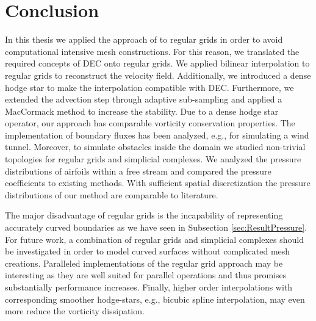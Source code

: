 \chapter{Conclusion}
\label{ch:Conclusion}

In this thesis we applied the approach of  to regular grids in order to avoid computational intensive mesh constructions.
For this reason, we translated the required concepts of DEC onto regular grids.
We applied bilinear interpolation to regular grids to reconstruct the velocity field.
Additionally, we introduced a dense hodge star to make the interpolation compatible with DEC.
Furthermore, we extended the advection step through adaptive sub-sampling and applied a MacCormack method to increase the stability.
Due to a dense hodge star operator, our approach has comparable vorticity conservation properties.
The implementation of boundary fluxes has been analyzed, e.g., for simulating a wind tunnel.
Moreover, to simulate obstacles inside the domain we studied non-trivial topologies for regular grids and simplicial complexes.
We analyzed the pressure distributions of airfoils within a free stream and compared the pressure coefficients to existing methods.%
With sufficient spatial discretization the pressure distributions of our method are comparable to literature.

The major disadvantage of regular grids is the incapability of representing accurately curved boundaries as we have seen in Subsection \ref{sec:ResultPressure}.
For future work, a combination of regular grids and simplicial complexes should be investigated in order to model curved surfaces without complicated mesh creations.
Paralleled implementations of the regular grid approach may be interesting as they are well suited for parallel operations and thus promises substantially performance increases.
Finally, higher order interpolations with corresponding smoother hodge-stars, e.g., bicubic spline interpolation, may even more reduce the vorticity dissipation.

\label{ch:conc}